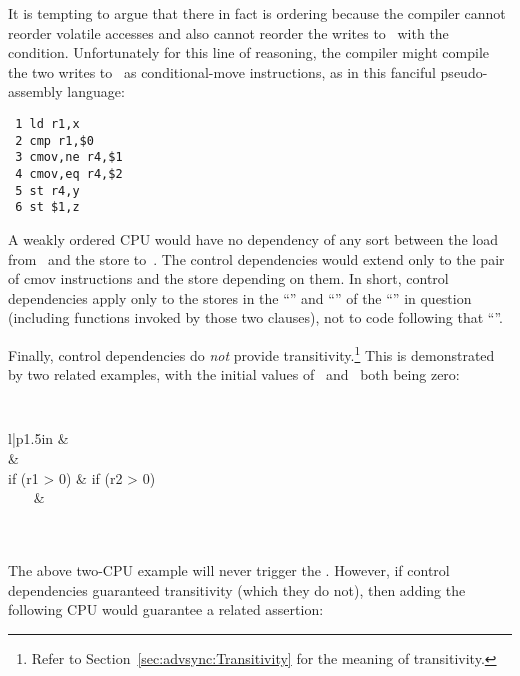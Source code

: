It is tempting to argue that there in fact is ordering because the
compiler cannot reorder volatile accesses and also cannot reorder
the writes to~ with the condition.
Unfortunately for this line
of reasoning, the compiler might compile the two writes to~ as
conditional-move instructions, as in this fanciful pseudo-assembly
language:

\vspace{5pt}
\begin{minipage}[t]{\columnwidth}
\scriptsize
\begin{verbatim}
 1 ld r1,x
 2 cmp r1,$0
 3 cmov,ne r4,$1
 4 cmov,eq r4,$2
 5 st r4,y
 6 st $1,z
\end{verbatim}
\end{minipage}
\vspace{5pt}

A weakly ordered CPU would have no dependency of any sort between the load
from~ and the store to~.
The control dependencies would extend
only to the pair of cmov instructions and the store depending on them.
In short, control dependencies apply only to the stores in the ``''
and ``'' of the ``'' in question (including functions
invoked by those two clauses), not to code following that ``''.

Finally, control dependencies do \emph{not} provide transitivity.\footnote{
	Refer to Section~\ref{sec:advsync:Transitivity} for
	the meaning of transitivity.}
This is demonstrated by two related examples, with the initial values
of~ and~ both being zero:

\vspace{5pt}
\begin{minipage}[t]{\columnwidth}
\tt
\scriptsize
\begin{tabular}{l|p{1.5in}}
	 &	\nf{CPU 1} \\
	\hline
	 &
		\tco{r2 = READ_ONCE(y);} \\
	if (r1 > 0) &
		if (r2 > 0) \\
	~~~ &
		~~~\tco{WRITE_ONCE(x, 1);} \\
	 \\
	 \\
\end{tabular}
\end{minipage}
\vspace{5pt}

The above two-CPU example will never trigger the .
However, if control dependencies guaranteed transitivity (which they do
not), then adding the following CPU would guarantee a related assertion:

